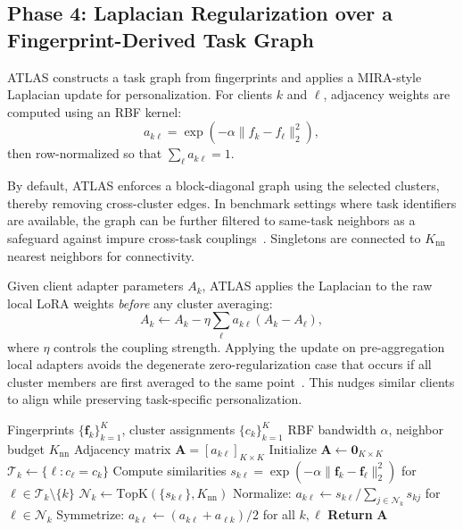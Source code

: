 \documentclass[conference]{IEEEtran}
\begin{document}
\subsection{Phase 4: Laplacian Regularization over a Fingerprint-Derived Task Graph}
\label{subsec:phase4}

ATLAS constructs a task graph from fingerprints and applies a MIRA-style Laplacian update for personalization. For clients $k$ and $\ell$, adjacency weights are computed using an RBF kernel:
\begin{equation}
a_{k\ell}=\exp\!\left(-\alpha \lVert f_k-f_\ell\rVert_2^2\right),
\end{equation}
then row-normalized so that $\sum_{\ell} a_{k\ell}=1$. 

By default, ATLAS enforces a block-diagonal graph using the selected clusters, thereby removing cross-cluster edges. In benchmark settings where task identifiers are available, the graph can be further filtered to same-task neighbors as a safeguard against impure cross-task couplings~\cite{cfl,ifca}. Singletons are connected to $K_\text{nn}$ nearest neighbors for connectivity.

Given client adapter parameters $A_k$, ATLAS applies the Laplacian to the raw local LoRA weights \emph{before} any cluster averaging:
\begin{equation}
A_k \leftarrow A_k - \eta \sum_{\ell} a_{k\ell}(A_k-A_\ell),
\end{equation}
where $\eta$ controls the coupling strength. Applying the update on pre-aggregation local adapters avoids the degenerate zero-regularization case that occurs if all cluster members are first averaged to the same point~\cite{mira,scaffold,pfedme}. This nudges similar clients to align while preserving task-specific personalization.

\begin{algorithm}[t]
\caption{Task Graph Construction with RBF Kernel}
\label{alg:task_graph}
\begin{algorithmic}[1]
\Require Fingerprints $\{\mathbf{f}_k\}_{k=1}^K$, cluster assignments $\{c_k\}_{k=1}^K$
\Require RBF bandwidth $\alpha$, neighbor budget $K_{\text{nn}}$
\Ensure Adjacency matrix $\mathbf{A} = [a_{k\ell}]_{K \times K}$
\State Initialize $\mathbf{A} \leftarrow \mathbf{0}_{K \times K}$
  \State $\mathcal{T}_k \leftarrow \{\ell : c_\ell = c_k\}$ 
  \State Compute similarities $s_{k\ell} = \exp(-\alpha \|\mathbf{f}_k - \mathbf{f}_\ell\|_2^2)$ for $\ell \in \mathcal{T}_k \setminus \{k\}$
  \State $\mathcal{N}_k \leftarrow \text{TopK}(\{s_{k\ell}\}, K_{\text{nn}})$
  \State Normalize: $a_{k\ell} \leftarrow s_{k\ell} / \sum_{j \in \mathcal{N}_k} s_{kj}$ for $\ell \in \mathcal{N}_k$
\EndFor
\State Symmetrize: $a_{k\ell} \leftarrow (a_{k\ell} + a_{\ell k}) / 2$ for all $k,\ell$
\State \textbf{Return} $\mathbf{A}$
\end{algorithmic}
\end{algorithm}
\end{document}
